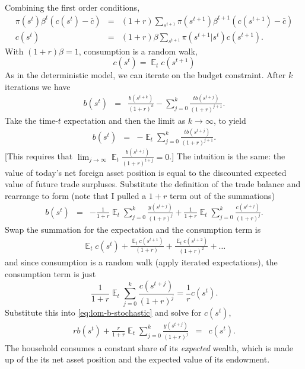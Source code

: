 \documentclass[11pt,pdftex,twoside,letterpaper]{exam}
\DeclareMathOperator{\EX}{\mathbb{E}}%
\begin{document}
Combining the first order conditions,
\begin{eqnarray}
   \pi(s^t)\beta^t \left( c(s^t) -\bar{c} \right)&=& (1+r)\sum_{s^{t+1}}\pi(s^{t+1})\beta^{t+1} \left( c(s^{t+1}) -\bar{c}\right)\\
   c(s^t)&=& (1+r)\beta\sum_{s^{t+1}}\pi(s^{t+1}|s^t) c(s^{t+1}).
\end{eqnarray}
With $(1+r)\beta=1$, consumption is a random walk,
\begin{equation}
  c(s^t)=\EX_tc(s^{t+1})
\end{equation}
As in the deterministic model, we can iterate on the budget constraint. After $k$ iterations we have
\begin{eqnarray}
   b(s^{t}) &=& \frac{b(s^{t+k})}{(1+r)^k}-\sum_{j=0}^k\frac{tb(s^{t+j})}{(1+r)^{j+1}}.
\end{eqnarray}
Take the time-$t$ expectation and  then the limit as $k\rightarrow\infty$, to yield
\begin{eqnarray}
   b(s^t) &=& -\EX_t\sum_{j=0}^k\frac{tb(s^{t+j})}{(1+r)^{j+1}}.
\end{eqnarray}
[This requires that $\lim_{j\rightarrow \infty}\EX_t\frac{b(s^{t+j})}{(1+r)^{t+j}}=0$.] The intuition is the same: the value of today's net foreign asset position is equal to the discounted expected value of future trade surpluses. Substitute the definition of the trade balance and rearrange to form (note that I pulled a $1+r$ term out of the summations)
\begin{eqnarray}
   b(s^t) &=& -\frac{1}{1+r}\EX_t\sum_{j=0}^k\frac{y(s^{t+j})}{(1+r)^{j}} + \frac{1}{1+r}\EX_t\sum_{j=0}^k\frac{c(s^{t+j})}{(1+r)^{j}}. \label{eq:lom-b-stochastic}
\end{eqnarray}
Swap the summation for the expectation and the consumption term is
\begin{eqnarray}
  \EX_tc(s^t) +\frac{\EX_tc(s^{t+1})}{(1+r)}+\frac{\EX_tc(s^{t+2})}{(1+r)^2}+\dots
\end{eqnarray}
and since consumption is a random walk (apply iterated expectations), the consumption term is just
\begin{equation}
  \frac{1}{1+r}\EX_t\sum_{j=0}^k\frac{c(s^{t+j})}{(1+r)^{j}} = \frac{1}{r}c(s^t).
\end{equation}
Substitute this into \eqref{eq:lom-b-stochastic} and solve for $c(s^t)$,
\begin{eqnarray}
   rb(s^{t}) + \frac{r}{1+r}\EX_t\sum_{j=0}^k\frac{y(s^{t+j})}{(1+r)^{j}}&=& c(s^t).
\end{eqnarray}
The household consumes a constant share of its \textit{expected} wealth, which is made up of the its net asset position and the expected value of its endowment.
\end{document}
